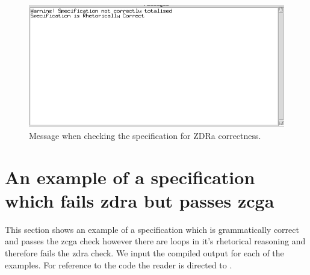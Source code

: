 \begin{figure}[H]
\includegraphics[scale=0.7]{examples/nonworkzcga/correct.png}
\caption{Message when checking the specification for ZDRa correctness.}
\end{figure}

\section{An example of a specification which fails \gls{zdra} but passes \gls{zcga}}
This section shows an example of a specification which is grammatically correct and passes the \gls{zcga} check however there are loops in it's rhetorical reasoning and therefore fails the \gls{zdra} check. We input the compiled output for each of the examples. For reference to the code the reader is directed to \cite{mathlangexamples}.

%
